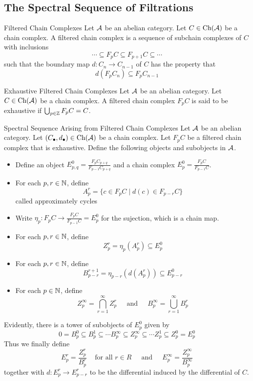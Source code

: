 \documentclass[a4paper]{article}
\begin{document}
\subsection{The Spectral Sequence of Filtrations}
\begin{defn}{Filtered Chain Complexes}{} Let $\mathcal{A}$ be an abelian category. Let $C\in\text{Ch}(\mathcal{A})$ be a chain complex. A filtered chain complex is a sequence of subchain complexes of $C$ with inclusions $$\cdots\subseteq F_pC\subseteq F_{p+1}C\subseteq\cdots$$ such that the boundary map $d:C_n\to C_{n-1}$ of $C$ has the property that $$d(F_pC_n)\subseteq F_pC_{n-1}$$
\end{defn}

\begin{defn}{Exhaustive Filtered Chain Complexes}{} Let $\mathcal{A}$ be an abelian category. Let $C\in\text{Ch}(\mathcal{A})$ be a chain complex. A filtered chain complex $F_pC$ is said to be exhaustive if $\bigcup_{p\in\mathbb{Z}}F_pC=C$. 
\end{defn}

\begin{defn}{Spectral Sequence Arising from Filtered Chain Complexes}{} Let $\mathcal{A}$ be an abelian category. Let $(C_\bullet,d_\bullet)\in\text{Ch}(\mathcal{A})$ be a chain complex. Let $F_pC$ be a filtered chain complex that is exhaustive. Define the following objects and subobjects in $\mathcal{A}$. 
\begin{itemize}
\item Define an object $E_{p,q}^0=\frac{F_pC_{p+q}}{F_{p-1}C_{p+q}}$ and a chain complex $E_p^0=\frac{F_pC}{F_{p-1}C}$. 
\item For each $p,r\in\mathbb{N}$, define $$A_p^r=\{c\in F_pC\;|\;d(c)\in F_{p-r}C\}$$ called approximately cycles
\item Write $\eta_p:F_pC\to\frac{F_pC}{F_{p-1}C}=E_p^0$ for the sujection, which is a chain map. 
\item For each $p,r\in\mathbb{N}$, define $$Z_p^r=\eta_p(A_p^r)\subseteq E_p^0$$
\item For each $p,r\in\mathbb{N}$, define $$B_{p-r}^{r+1}=\eta_{p-r}(d(A_p^r))\subseteq E_{p-r}^0$$
\item For each $p\in\mathbb{N}$, define $$Z_p^\infty=\bigcap_{r=1}^\infty Z_p^r\;\;\;\;\text{ and }\;\;\;\; B_p^\infty=\bigcup_{r=1}^\infty B_p^r$$
\end{itemize}
Evidently, there is a tower of subobjects of $E_p^0$ given by $$0=B_p^0\subseteq B_p^1\subseteq\cdots B_p^\infty\subseteq Z_p^\infty\subseteq\cdots Z_p^1\subseteq Z_p^0=E_p^0$$ Thus we finally define $$E_p^r=\frac{Z_p^r}{B_p^r}\;\;\;\text{ for all }r\in R\;\;\;\;\text{ and }\;\;\;\;E_p^\infty=\frac{Z_p^\infty}{B_p^\infty}$$ together with $d:E_p^r\to E_{p-r}^r$ to be the differential induced by the differential of $C$. 
\end{defn}
\end{document}

